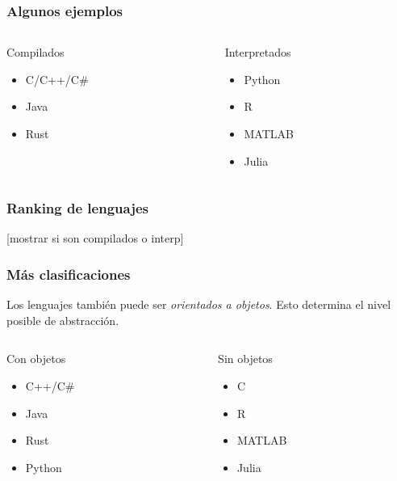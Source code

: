 \documentclass[14pt,aspectratio=169,xcolor=dvipsnames]{beamer}
\begin{document}
\begin{frame}\frametitle{Algunos ejemplos}
    \begin{columns}
        \begin{column}{0.45\textwidth}
            Compilados
            \begin{itemize}
                \item C/C++/C\#
                \item Java
                \item Rust
            \end{itemize}
        \end{column}

        \begin{column}{0.45\textwidth}
            Interpretados
            \begin{itemize}
                \item Python
                \item R
                \item MATLAB
                \item Julia
            \end{itemize}
        \end{column}
    \end{columns}
\end{frame}
\begin{frame}\frametitle{Ranking de lenguajes}
[mostrar si son compilados o interp]
\end{frame}
\begin{frame}\frametitle{Más clasificaciones}
Los lenguajes también puede ser \emph{orientados a objetos}. Esto determina el nivel posible de abstracción.
    \begin{columns}
        \begin{column}{0.45\textwidth}
            Con objetos
            \begin{itemize}
                \item C++/C\#
                \item Java
                \item Rust
                \item Python
            \end{itemize}
        \end{column}

        \begin{column}{0.45\textwidth}
            Sin objetos
            \begin{itemize}
                \item C
                \item R
                \item MATLAB
                \item Julia
            \end{itemize}
        \end{column}
    \end{columns}
\end{frame}
\end{document}
